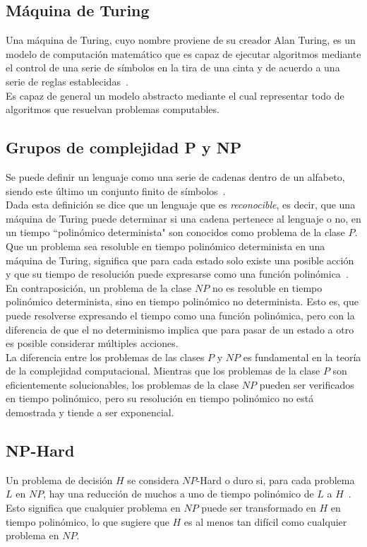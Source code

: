\subsection{Máquina de Turing}
Una máquina de Turing, cuyo nombre proviene de su creador Alan Turing, es un modelo de computación matemático que es capaz de ejecutar algoritmos mediante el control de una serie de símbolos en la tira de una cinta y de acuerdo a una serie de reglas establecidas~\cite{stone1972}.\\[6pt]
Es capaz de general un modelo abstracto mediante el cual representar todo de algoritmos que resuelvan problemas computables.

\subsection{Grupos de complejidad P y NP}\label{complexity}
Se puede definir un lenguaje como una serie de cadenas dentro de un alfabeto, siendo este último un conjunto finito de símbolos~\cite{johnjeffery_automata}. \\[6pt]
Dada esta definición se dice que un lenguaje que es \textit{reconocible}, es decir, que una máquina de Turing puede determinar si una cadena pertenece al lenguaje o no, en un tiempo ``polinómico determinista" son conocidos como problema de la clase $P$. Que un problema sea resoluble en tiempo polinómico determinista en una máquina de Turing, significa que para cada estado solo existe una posible acción y que su tiempo de resolución puede expresarse como una función polinómica~\cite{johnjeffery_automata}. \\[6pt]
En contraposición, un problema de la clase $NP$ no es resoluble en tiempo polinómico determinista, sino en tiempo polinómico no determinista. Esto es, que puede resolverse expresando el tiempo como una función polinómica, pero con la diferencia de que el no determinismo implica que para pasar de un estado a otro es posible considerar múltiples acciones.\\[6pt]
La diferencia entre los problemas de las clases $P$ y $NP$ es fundamental en la teoría de la complejidad computacional. Mientras que los problemas de la clase $P$ son eficientemente solucionables, los problemas de la clase $NP$ pueden ser verificados en tiempo polinómico, pero su resolución en tiempo polinómico no está demostrada y tiende a ser exponencial.\\[6pt]

\subsection{NP-Hard}
Un problema de decisión $H$ se considera $NP$-Hard o duro si, para cada problema $L$ en $NP$, hay una reducción de muchos a uno de tiempo polinómico de $L$ a $H$~\cite{leeuwen_algorithms_1998,johnjeffery_automata}. Esto significa que cualquier problema en $NP$ puede ser transformado en $H$ en tiempo polinómico, lo que sugiere que $H$ es al menos tan difícil como cualquier problema en $NP$.

